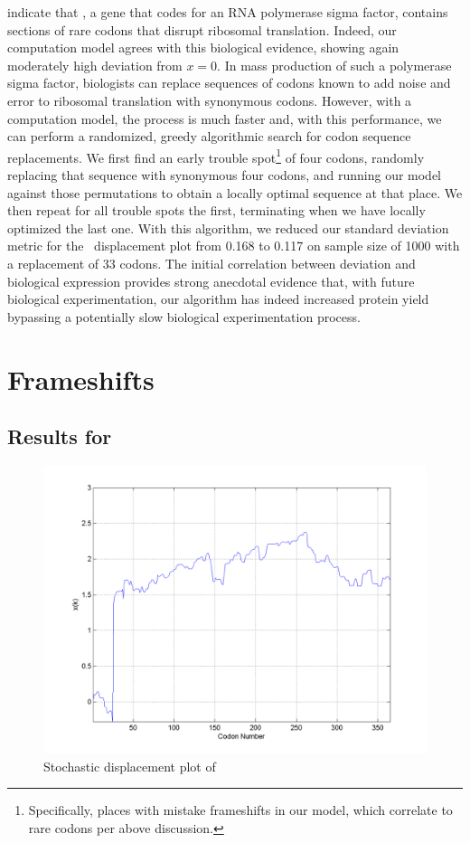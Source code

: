 \documentclass[12pt, draft]{article}
\numberwithin{equation}{section}
\begin{document}

\citet{rpoS:process} indicate that \rpoS, a gene that codes for an RNA
polymerase sigma factor, contains sections of rare codons that disrupt
ribosomal translation. Indeed, our computation model agrees with this
biological evidence, showing again moderately high deviation from $x =
0$. In mass production of such a polymerase sigma factor, biologists
can replace sequences of codons known to add noise and error to
ribosomal translation with synonymous codons. 
However, with a computation model, the process is much
faster and, with this performance, we can perform a randomized, greedy
algorithmic search for codon sequence replacements. We first find an
early trouble spot\footnote{Specifically, places with
  mistake frameshifts in our model, which correlate to rare codons per
  above discussion.} of four codons, randomly replacing that sequence
with synonymous four codons, and running our model against those
permutations to obtain a locally optimal sequence at that place. We
then repeat for all trouble spots the first, terminating when we have locally
optimized the last one. With this algorithm, we reduced our standard
deviation metric for the \rpoS\ displacement plot from 0.168 to 0.117
on sample size of 1000 with a replacement of 33 codons. The
initial correlation between deviation and biological expression
provides strong anecdotal evidence that, with future biological
experimentation, our algorithm has indeed increased protein yield
bypassing a potentially slow biological experimentation process.

\section{Frameshifts}

\subsection{Results for \prfB}

\begin{figure}
  \centering
  \caption{Stochastic displacement plot of \prfB}
  \label{prfB}
  \includegraphics[scale=0.4]{prfB/disp}
\end{figure}
\end{document}
